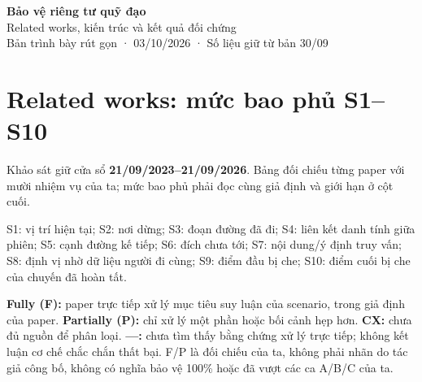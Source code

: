 \documentclass[10pt,a4paper]{article}
\begin{document}
\begin{center}{\LARGE\bfseries\color{ink}Bảo vệ riêng tư quỹ đạo}\\[5pt]{\large Related works, kiến trúc và kết quả đối chứng}\\[4pt]{\small Bản trình bày rút gọn · 03/10/2026 · Số liệu giữ từ bản 30/09}\end{center}
\section{Related works: mức bao phủ S1–S10}\label{sec:1}
Khảo sát giữ cửa sổ \textbf{21/09/2023–21/09/2026}. Bảng đối chiếu từng paper với mười nhiệm vụ của ta; mức bao phủ phải đọc cùng giả định và giới hạn ở cột cuối.

S1: vị trí hiện tại; S2: nơi dừng; S3: đoạn đường đã đi; S4: liên kết danh tính giữa phiên; S5: cạnh đường kế tiếp; S6: đích chưa tới; S7: nội dung/ý định truy vấn; S8: định vị nhờ dữ liệu người đi cùng; S9: điểm đầu bị che; S10: điểm cuối bị che của chuyến đã hoàn tất.

\textbf{Fully (F):} paper trực tiếp xử lý mục tiêu suy luận của scenario, trong giả định của paper. \textbf{Partially (P):} chỉ xử lý một phần hoặc bối cảnh hẹp hơn. \textbf{CX:} chưa đủ nguồn để phân loại. \textbf{—:} chưa tìm thấy bằng chứng xử lý trực tiếp; không kết luận cơ chế chắc chắn thất bại. F/P là đối chiếu của ta, không phải nhãn do tác giả công bố, không có nghĩa bảo vệ 100\% hoặc đã vượt các ca A/B/C của ta.
\end{document}

